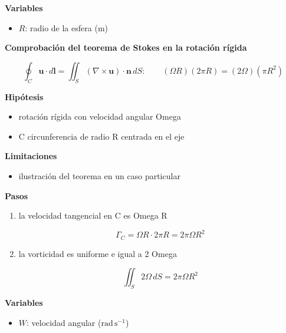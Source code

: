 \documentclass[10pt,openany]{book}
\begin{document}
\begin{tcolorbox}[title={Desarrollos del modelo}, studiumdef, breakable]
\noindent\textbf{Variables}
\begin{itemize}
\item $R$: radio de la esfera ($\mathrm{m}$)
\end{itemize}



\noindent\textbf{Comprobación del teorema de Stokes en la rotación rígida}

\[
\oint_C \mathbf{u}\cdot d\mathbf{l} = \iint_S (\nabla\times\mathbf{u})\cdot\mathbf{n}\,dS:\qquad (\Omega R)(2\pi R) = (2\Omega)(\pi R^{2})
\]

\noindent\textbf{Hipótesis}
\begin{itemize}
\item rotación rígida con velocidad angular Omega
\item C circunferencia de radio R centrada en el eje
\end{itemize}

\noindent\textbf{Limitaciones}
\begin{itemize}
\item ilustración del teorema en un caso particular
\end{itemize}

\noindent\textbf{Pasos}
\begin{enumerate}
\item
la velocidad tangencial en C es Omega R

\[
\Gamma_C = \Omega R\cdot 2\pi R = 2\pi\Omega R^{2}
\]
\item
la vorticidad es uniforme e igual a 2 Omega

\[
\iint_S 2\Omega\,dS = 2\pi\Omega R^{2}
\]
\end{enumerate}

\noindent\textbf{Variables}
\begin{itemize}
\item $W$: velocidad angular ($\mathrm{rad}\,\mathrm{s}^{-1}$)
\end{itemize}


\end{tcolorbox}
\end{document}
